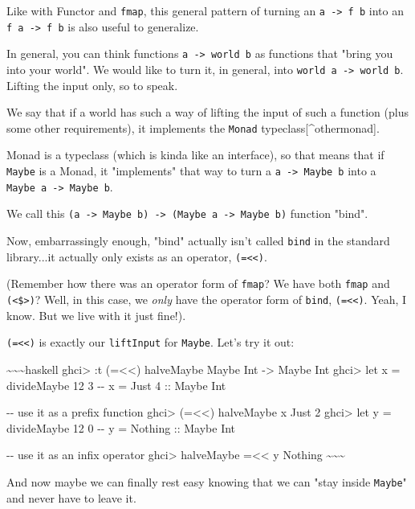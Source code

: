 \documentclass[]{article}
\begin{document}
Like with Functor and \texttt{fmap}, this general pattern of turning an
\texttt{a\ -\textgreater{}\ f\ b} into an \texttt{f\ a\ -\textgreater{}\ f\ b}
is also useful to generalize.

In general, you can think functions \texttt{a\ -\textgreater{}\ world\ b} as
functions that "bring you into your world". We would like to turn it, in
general, into \texttt{world\ a\ -\textgreater{}\ world\ b}. Lifting the input
only, so to speak.

We say that if a world has such a way of lifting the input of such a function
(plus some other requirements), it implements the \texttt{Monad}
typeclass{[}\^{}othermonad{]}.

Monad is a typeclass (which is kinda like an interface), so that means that if
\texttt{Maybe} is a Monad, it "implements" that way to turn a
\texttt{a\ -\textgreater{}\ Maybe\ b} into a
\texttt{Maybe\ a\ -\textgreater{}\ Maybe\ b}.

We call this
\texttt{(a\ -\textgreater{}\ Maybe\ b)\ -\textgreater{}\ (Maybe\ a\ -\textgreater{}\ Maybe\ b)}
function "bind".

Now, embarrassingly enough, "bind" actually isn't called \texttt{bind} in the
standard library...it actually only exists as an operator,
\texttt{(=\textless{}\textless{})}.

(Remember how there was an operator form of \texttt{fmap}? We have both
\texttt{fmap} and \texttt{(\textless{}\$\textgreater{})}? Well, in this case, we
\emph{only} have the operator form of \texttt{bind},
\texttt{(=\textless{}\textless{})}. Yeah, I know. But we live with it just
fine!).

\texttt{(=\textless{}\textless{})} is exactly our \texttt{liftInput} for
\texttt{Maybe}. Let's try it out:

\textasciitilde{}\textasciitilde{}\textasciitilde{}haskell ghci\textgreater{} :t
(=\textless{}\textless{}) halveMaybe Maybe Int -\textgreater{} Maybe Int
ghci\textgreater{} let x = divideMaybe 12 3 -\/- x = Just 4 :: Maybe Int

-\/- use it as a prefix function ghci\textgreater{} (=\textless{}\textless{})
halveMaybe x Just 2 ghci\textgreater{} let y = divideMaybe 12 0 -\/- y = Nothing
:: Maybe Int

-\/- use it as an infix operator ghci\textgreater{} halveMaybe
=\textless{}\textless{} y Nothing
\textasciitilde{}\textasciitilde{}\textasciitilde{}

And now maybe we can finally rest easy knowing that we can "stay inside
\texttt{Maybe}" and never have to leave it.
\end{document}
